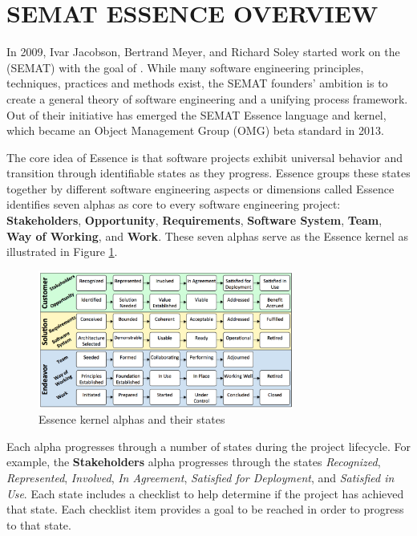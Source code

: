 \section{SEMAT ESSENCE OVERVIEW}
In 2009, Ivar Jacobson, Bertrand Meyer, and Richard Soley started work on the  (SEMAT) with the goal of  \cite{JacobsonCallForAction}. While many software engineering principles, techniques, practices and methods exist, the SEMAT founders' ambition is to create a general theory of software engineering and a unifying process framework. Out of their initiative has emerged the SEMAT Essence language and kernel, which became an Object Management Group (OMG) beta standard in 2013.

The core idea of Essence is that software projects exhibit universal behavior and transition through identifiable states as they progress. Essence groups these states together by different software engineering aspects or dimensions called  Essence identifies seven alphas as core to every software engineering project: \textbf{Stakeholders}, \textbf{Opportunity}, \textbf{Requirements}, \textbf{Software System}, \textbf{Team}, \textbf{Way of Working}, and \textbf{Work}. These seven alphas serve as the Essence kernel as illustrated in Figure \ref{EssenceKernel}.

\begin{figure}[h]
\centering
\includegraphics[width=3.30in]{project_steering_images/EssenceKernel.png}
\caption{Essence kernel alphas and their states }
\label{EssenceKernel}
\end{figure}

Each alpha progresses through a number of states during the project lifecycle. For example, the \textbf{Stakeholders} alpha progresses through the states \textit{Recognized}, \textit{Represented}, \textit{Involved}, \textit{In Agreement}, \textit{Satisfied for Deployment}, and \textit{Satisfied in Use}. Each state includes a checklist to help determine if the project has achieved that state. Each checklist item provides a goal to be reached in order to progress to that state.


